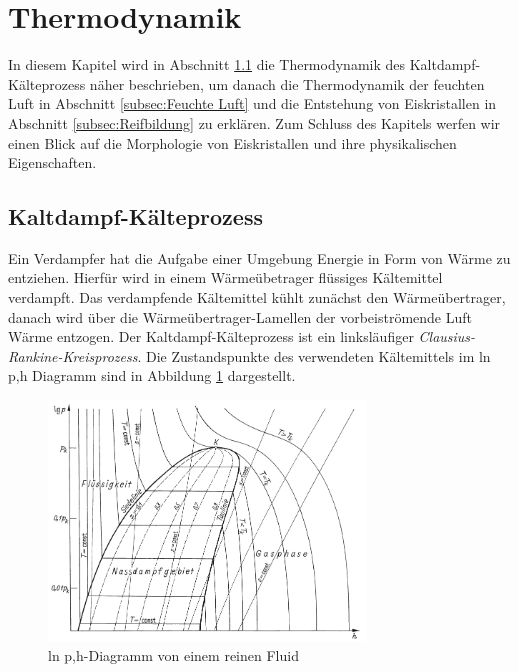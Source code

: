 \section{Thermodynamik }
\label{sec:Thermodynamik }

In diesem Kapitel wird in Abschnitt \ref{subsec:Kaltdampf-Kaelteprozess} die Thermodynamik des Kaltdampf-Kälteprozess näher beschrieben, um danach die Thermodynamik der feuchten Luft in Abschnitt \ref{subsec:Feuchte Luft} und die Entstehung von Eiskristallen in Abschnitt \ref{subsec:Reifbildung} zu erklären. Zum Schluss des Kapitels werfen wir einen Blick auf die Morphologie von Eiskristallen und ihre physikalischen Eigenschaften.


\subsection{Kaltdampf-Kälteprozess}
\label{subsec:Kaltdampf-Kaelteprozess}



Ein Verdampfer hat die Aufgabe einer Umgebung Energie in Form von Wärme zu entziehen. Hierfür wird in einem Wärmeübetrager flüssiges Kältemittel verdampft. Das verdampfende Kältemittel kühlt zunächst den Wärmeübertrager, danach wird über die Wärmeübertrager-Lamellen der vorbeiströmende Luft Wärme entzogen.
Der Kaltdampf-Kälteprozess ist ein linksläufiger \textit{Clausius-Rankine-Kreisprozess}. Die Zustandspunkte des verwendeten Kältemittels im ln p,h Diagramm sind in Abbildung \ref{fig:Schema p-h-Diagramm} dargestellt. 

\begin{figure}[htb]
\centering		
\includegraphics[width=0.75\textwidth]{Pictures/log_p_h_Beahr_Schema.png}
\caption{ln p,h-Diagramm von einem reinen Fluid  \citep{Baehr2013}}
\label{fig:Schema p-h-Diagramm}
\end{figure}

